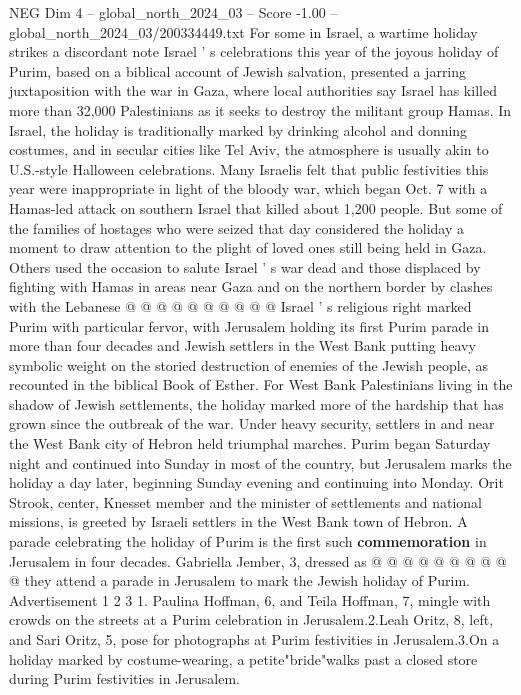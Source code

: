 \begin{textsample}{NEG Dim 4 – global\_north\_2024\_03 – Score -1.00 – global\_north\_2024\_03/200334449.txt}  \label{ex:f4_neg_222}
For some in Israel, a wartime holiday strikes a discordant note Israel ' s celebrations this year of the joyous holiday of Purim, based on a biblical account of Jewish salvation, presented a jarring juxtaposition with the war in Gaza, where local authorities say Israel has killed more than 32,000 Palestinians as it seeks to destroy the militant group Hamas.
In Israel, the holiday is traditionally marked by drinking alcohol and donning costumes, and in secular cities like Tel Aviv, the atmosphere is usually akin to U.S.-style Halloween celebrations.
Many Israelis felt that public festivities this year were inappropriate in light of the bloody war, which began Oct. 7 with a Hamas-led attack on southern Israel that killed about 1,200 people.
But some of the families of hostages who were seized that day considered the holiday a moment to draw attention to the plight of loved ones still being held in Gaza.
Others used the occasion to salute Israel ' s war dead and those displaced by fighting with Hamas in areas near Gaza and on the northern border by clashes with the Lebanese @ @ @ @ @ @ @ @ @ @ Israel ' s religious right marked Purim with particular fervor, with Jerusalem holding its first Purim parade in more than four decades and Jewish settlers in the West Bank putting heavy symbolic weight on the storied destruction of enemies of the Jewish people, as recounted in the biblical Book of Esther.
For West Bank Palestinians living in the shadow of Jewish settlements, the holiday marked more of the hardship that has grown since the outbreak of the war.
Under heavy security, settlers in and near the West Bank city of Hebron held triumphal marches.
Purim began Saturday night and continued into Sunday in most of the country, but Jerusalem marks the holiday a day later, beginning Sunday evening and continuing into Monday.
Orit Strook, center, Knesset member and the minister of settlements and national missions, is greeted by Israeli settlers in the West Bank town of Hebron.
A parade celebrating the holiday of Purim is the first such \textbf{commemoration} in Jerusalem in four decades.
Gabriella Jember, 3, dressed as @ @ @ @ @ @ @ @ @ @ they attend a parade in Jerusalem to mark the Jewish holiday of Purim.
Advertisement 1 2 3 1.
Paulina Hoffman, 6, and Teila Hoffman, 7, mingle with crowds on the streets at a Purim celebration in Jerusalem.2.Leah Oritz, 8, left, and Sari Oritz, 5, pose for photographs at Purim festivities in Jerusalem.3.On a holiday marked by costume-wearing, a petite"bride"walks past a closed store during Purim festivities in Jerusalem.

\end{textsample}
